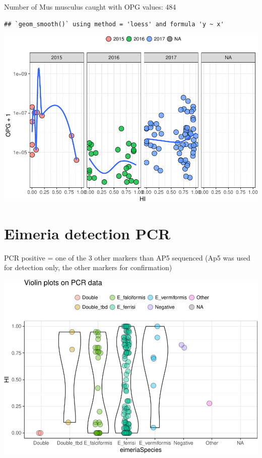 \documentclass[]{article}
\begin{document}
Number of Mus musculus caught with OPG values: 484

\begin{verbatim}
## `geom_smooth()` using method = 'loess' and formula 'y ~ x'
\end{verbatim}

\includegraphics{Data_Analysis_Alice_files/figure-latex/oocystssmooth-1.pdf}

\section{Eimeria detection PCR}\label{eimeria-detection-pcr}

PCR positive = one of the 3 other markers than AP5 sequenced (Ap5 was
used for detection only, the other markers for confirmation)

\includegraphics{Data_Analysis_Alice_files/figure-latex/pcr-1.pdf}
\end{document}
